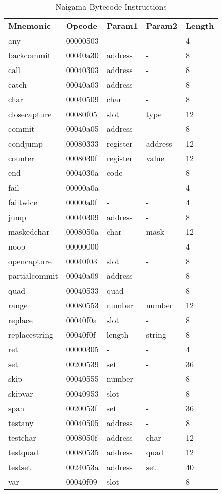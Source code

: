 
\begin{table}[]
\centering
\caption{Naigama Bytecode Instructions}
\label{tab:naig_bytecode}
\begin{tabular}{lllll}
\textbf{Mnemonic} & \textbf{Opcode} & \textbf{Param1} & \textbf{Param2} & \textbf{Length} \\
any & 00000503 & - & -  & 4 \\
backcommit & 00040a30 & address & -  & 8 \\
call & 00040303 & address & -  & 8 \\
catch & 00040a03 & address & -  & 8 \\
char & 00040509 & char & -  & 8 \\
closecapture & 00080f05 & slot & type  & 12 \\
commit & 00040a05 & address & -  & 8 \\
condjump & 00080333 & register & address  & 12 \\
counter & 0008030f & register & value  & 12 \\
end & 0004030a & code & -  & 8 \\
fail & 00000a0a & - & -  & 4 \\
failtwice & 00000a0f & - & -  & 4 \\
jump & 00040309 & address & -  & 8 \\
maskedchar & 0008050a & char & mask  & 12 \\
noop & 00000000 & - & -  & 4 \\
opencapture & 00040f03 & slot & -  & 8 \\
partialcommit & 00040a09 & address & -  & 8 \\
quad & 00040533 & quad & -  & 8 \\
range & 00080553 & number & number  & 12 \\
replace & 00040f0a & slot & -  & 8 \\
replacestring & 00040f0f & length & string  & 8 \\
ret & 00000305 & - & -  & 4 \\
set & 00200539 & set & -  & 36 \\
skip & 00040555 & number & -  & 8 \\
skipvar & 00040953 & slot & -  & 8 \\
span & 0020053f & set & -  & 36 \\
testany & 00040505 & address & -  & 8 \\
testchar & 0008050f & address & char  & 12 \\
testquad & 00080535 & address & quad  & 12 \\
testset & 0024053a & address & set  & 40 \\
var & 00040f09 & slot & -  & 8 \\
\end{tabular}
\end{table}
